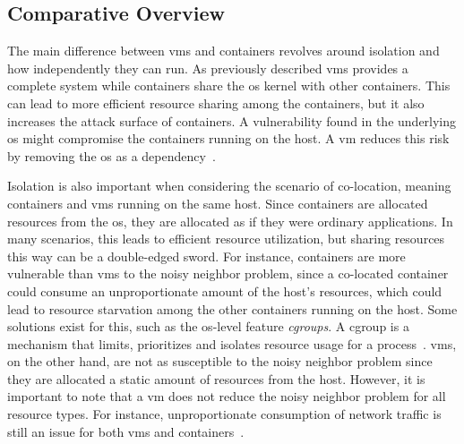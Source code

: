 \documentclass{kththesis}
\begin{document}
\subsection{Comparative Overview}
\label{container-vm-isolation}
The main difference between \Glspl{vm} and containers revolves around isolation and how independently they can run. As previously described \Glspl{vm} provides a complete system while containers share the \Gls{os} kernel with other containers. This can lead to more efficient resource sharing among the containers, but it also increases the attack surface of containers. A vulnerability found in the underlying \Gls{os} might compromise the containers running on the host. A \Gls{vm} reduces this risk by removing the \Gls{os} as a dependency\ \cite{container-kata-security}.

Isolation is also important when considering the scenario of co-location, meaning containers and \Glspl{vm} running on the same host. Since containers are allocated resources from the \Gls{os}, they are allocated as if they were ordinary applications. In many scenarios, this leads to efficient resource utilization, but sharing resources this way can be a double-edged sword. For instance, containers are more vulnerable than \Glspl{vm} to the noisy neighbor problem, since a co-located container could consume an unproportionate amount of the host's resources, which could lead to resource starvation among the other containers running on the host. Some solutions exist for this, such as the \Gls{os}-level feature \textit{cgroups}. A cgroup is a mechanism that limits, prioritizes and isolates resource usage for a process\ \cite{cgroups, vm-noisy-neighbor, container-vm-scale}. \Glspl{vm}, on the other hand, are not as susceptible to the noisy neighbor problem since they are allocated a static amount of resources from the host. However, it is important to note that a \Gls{vm} does not reduce the noisy neighbor problem for all resource types. For instance, unproportionate consumption of network traffic is still an issue for both \Glspl{vm} and containers\ \cite{container-vm-comparison}. 
\end{document}
